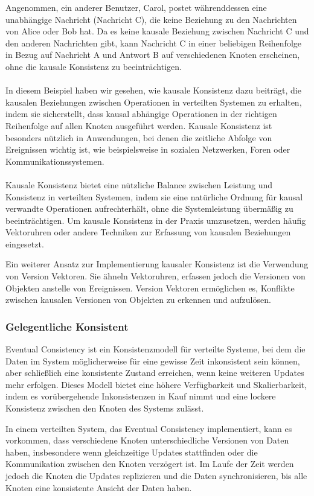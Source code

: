 Angenommen, ein anderer Benutzer, Carol, postet währenddessen eine unabhängige Nachricht (Nachricht C), die keine Beziehung zu den Nachrichten von Alice oder Bob hat. Da es keine kausale Beziehung zwischen Nachricht C und den anderen Nachrichten gibt, kann Nachricht C in einer beliebigen Reihenfolge in Bezug auf Nachricht A und Antwort B auf verschiedenen Knoten erscheinen, ohne die kausale Konsistenz zu beeinträchtigen.
\\\\
In diesem Beispiel haben wir gesehen, wie kausale Konsistenz dazu beiträgt, die kausalen Beziehungen zwischen Operationen in verteilten Systemen zu erhalten, indem sie sicherstellt, dass kausal abhängige Operationen in der richtigen Reihenfolge auf allen Knoten ausgeführt werden. Kausale Konsistenz ist besonders nützlich in Anwendungen, bei denen die zeitliche Abfolge von Ereignissen wichtig ist, wie beispielsweise in sozialen Netzwerken, Foren oder Kommunikationssystemen.
\\\\
Kausale Konsistenz bietet eine nützliche Balance zwischen Leistung und Konsistenz in verteilten Systemen, indem sie eine natürliche Ordnung für kausal verwandte Operationen aufrechterhält, ohne die Systemleistung übermäßig zu beeinträchtigen. Um kausale Konsistenz in der Praxis umzusetzen, werden häufig Vektoruhren oder andere Techniken zur Erfassung von kausalen Beziehungen eingesetzt.

Ein weiterer Ansatz zur Implementierung kausaler Konsistenz ist die Verwendung von Version Vektoren. Sie ähneln Vektoruhren, erfassen jedoch die Versionen von Objekten anstelle von Ereignissen. Version Vektoren ermöglichen es, Konflikte zwischen kausalen Versionen von Objekten zu erkennen und aufzulösen.

\subsubsection{Gelegentliche Konsistent}
Eventual Consistency ist ein Konsistenzmodell für verteilte Systeme, bei dem die Daten im System möglicherweise für eine gewisse Zeit inkonsistent sein können, aber schließlich eine konsistente Zustand erreichen, wenn keine weiteren Updates mehr erfolgen. Dieses Modell bietet eine höhere Verfügbarkeit und Skalierbarkeit, indem es vorübergehende Inkonsistenzen in Kauf nimmt und eine lockere Konsistenz zwischen den Knoten des Systems zulässt.

In einem verteilten System, das Eventual Consistency implementiert, kann es vorkommen, dass verschiedene Knoten unterschiedliche Versionen von Daten haben, insbesondere wenn gleichzeitige Updates stattfinden oder die Kommunikation zwischen den Knoten verzögert ist. Im Laufe der Zeit werden jedoch die Knoten die Updates replizieren und die Daten synchronisieren, bis alle Knoten eine konsistente Ansicht der Daten haben.

